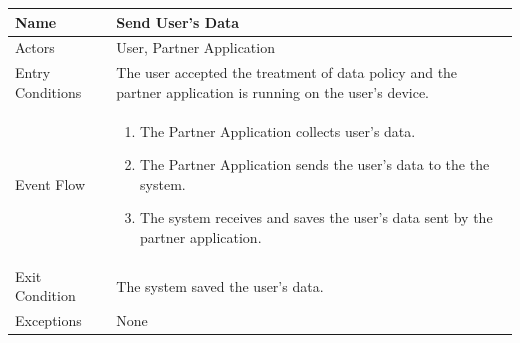 \begin{enumerate}
\FloatBarrier
\begin{table}[h]
\begin{tabular}{|l|p{}|}
\hline
Name             & Send User's Data\\ \hline
Actors           & User, Partner Application  \\ \hline
Entry Conditions & The user accepted the treatment of data policy and the partner application is running on the user's device.  \\ \hline
Event Flow       & \begin{enumerate}
			\item The Partner Application collects user's data.
            \item The Partner Application sends the user's data to the the system.
            \item The system receives and saves the user's data sent by the partner application.
        \end{enumerate}\\ \hline
Exit Condition   & The system saved the user's data.\\ \hline
Exceptions       & None \\ \hline
\end{tabular}
\end{table}
\FloatBarrier
\newpage


\end{enumerate}
